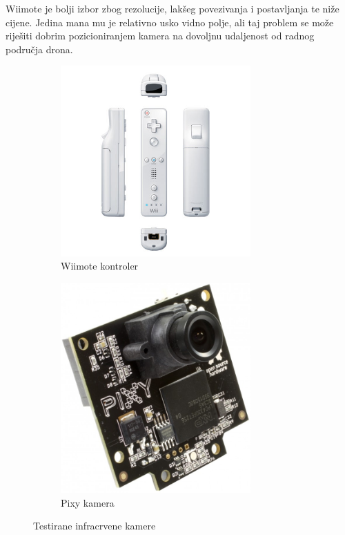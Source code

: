 \documentclass[times, utf8, diplomski]{fer}
\begin{document}
Wiimote je bolji izbor zbog rezolucije, lakšeg povezivanja i postavljanja te niže cijene. Jedina mana mu je relativno usko vidno polje, ali taj problem se može riješiti dobrim pozicioniranjem kamera na dovoljnu udaljenost od radnog područja drona.

\begin{figure}[h]
\begin{subfigure}[b]{.5\textwidth}
\centering
\includegraphics[width=0.8\textwidth]{Nintendo-Wiimote}
\caption{Wiimote kontroler \protect\footnotemark[1]}
\label{fig:wiimote}
\end{subfigure}
\begin{subfigure}[b]{.4\textwidth}
\centering
\includegraphics[width=0.8\textwidth]{pixy}
\caption{Pixy kamera \protect\footnotemark[2]}
\label{fig:pixy}
\end{subfigure}
\caption{Testirane infracrvene kamere}
\label{fig:cams}
\end{figure}
\end{document}
